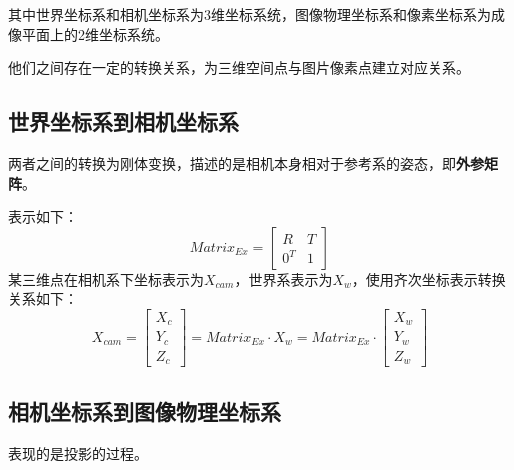\documentclass[10pt,a4paper]{article}
\begin{document}
\begin{CJK*}{UTF8}{gbsn}
其中世界坐标系和相机坐标系为3维坐标系统，图像物理坐标系和像素坐标系为成像平面上的2维坐标系统。

他们之间存在一定的转换关系，为三维空间点与图片像素点建立对应关系。
\subsection{世界坐标系到相机坐标系}
两者之间的转换为刚体变换，描述的是相机本身相对于参考系的姿态，即\textbf{外参矩阵}。

表示如下：
\[Matrix_{Ex} = \begin{bmatrix}
R & T \\
0^{T} & 1
\end{bmatrix}\]
某三维点在相机系下坐标表示为$X_{cam}$，世界系表示为$X_{w}$，使用齐次坐标表示转换关系如下：
\begin{equation}
\label{ex}
X_{cam} = \begin{bmatrix} X_c \\ Y_c \\ Z_c\end{bmatrix}
= Matrix_{Ex} \cdot X_w= Matrix_{Ex} \cdot\begin{bmatrix}X_w \\ Y_w \\ Z_w\end{bmatrix}
\end{equation}

\subsection{相机坐标系到图像物理坐标系}
表现的是投影的过程。


\end{CJK*}
\end{document}
